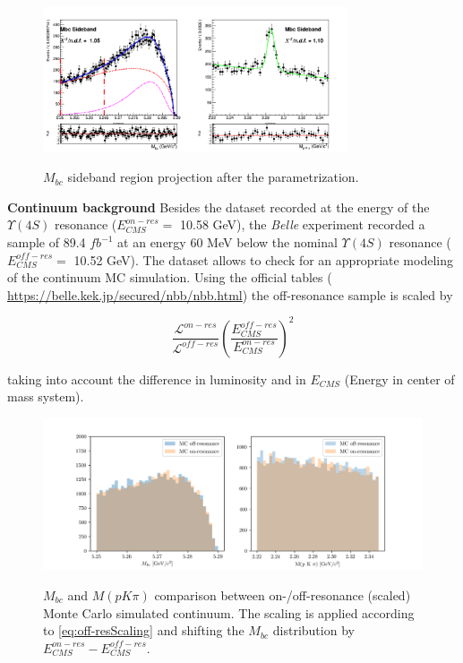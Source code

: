 \begin{figure}[H]
{\includegraphics[width=0.8\textwidth]{04-chargedCorrBtoLambda/figs/Mbc_Sideband_stream12345_Crossfeed_charged_corrLambdaC_2Dfit_afterParametrization.png}}
\caption{$M_{bc}$ sideband region projection after the parametrization. }
\label{fig:corrrectedMbc_Sideband_stream12345_Crossfeed_charged_corrLambdaC}
\end{figure}



\noindent \textbf{Continuum background}
\newline
Besides the dataset recorded at the energy of the $\Upsilon(4S) $ resonance  ($E^{on-res}
_{CMS} = $ 10.58 GeV), the \textit{Belle} experiment recorded a sample of 89.4 $fb^{-1}$ at an energy 60 MeV below the nominal  $\Upsilon(4S) $ resonance ($E^{off-res}_{CMS} = $ 10.52 GeV). The dataset allows to check for an appropriate modeling of the continuum MC simulation. %
Using the official tables \newline ( \url{https://belle.kek.jp/secured/nbb/nbb.html}) the off-resonance sample is scaled by 

\begin{equation}
    \frac{\mathcal{L}^{on-res}}{\mathcal{L}^{off-res}} \left( \frac{E^{off-res}_{CMS}}{E^{on-res}_{CMS}}\right)^2
\label{eq:off-resScaling}
\end{equation}


\noindent taking into account the difference in luminosity and in $E_{CMS}$ (Energy in center of mass system).


\begin{figure}[h!]
{\includegraphics[width=1.05\textwidth]{04-chargedCorrBtoLambda/figs/MbcInvM_MC_on_off-resonance_comparison.png}}
\caption{$M_{bc}$ and $M(p K \pi)$ comparison between  on-/off-resonance (scaled) Monte Carlo simulated continuum. The scaling is applied according to \cref{eq:off-resScaling} and shifting the $M_{bc}$ distribution by $E^{on-res}_{CMS} - E^{off-res}_{CMS}$. }
\label{fig:MbcInvM_MC_on_off-resonance_comparison}
\end{figure} 

